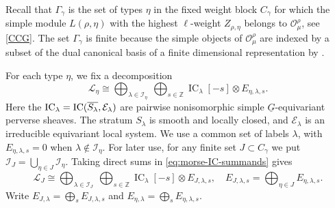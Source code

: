 \documentclass[11pt,reqno]{amsart}
\theoremstyle{definition}
\theoremstyle{remark}
\def\bbZ{\mathbb Z}
\def\dG{\underline G}
\def\scrO{\mathscr O}
\def\IC{\operatorname{IC}}
\begin{document}
Recall that $\Gamma_\gamma$ is the set of types $\eta$ in the fixed weight block $C_\gamma$
for which the simple module $L(\rho,\eta)$ with the highest $\ell$-weight
$Z_{\rho,\eta}$ belongs to $\scrO_\mu^\rho$, see \eqref{CCG}. 
The set $\Gamma_\gamma$ is finite because the simple objects of $\scrO_\mu^\rho$
 are indexed by a subset of
the dual canonical basis of a finite dimensional representation by
\cite[Prop.~4.4.1, Thm.~4.4.2]{VV25}.

For each type $\eta$, we fix a decomposition
\begin{equation}\label{eq:morse-IC-summands}
 \mathscr L_\eta\cong\bigoplus_{\lambda\in\mathcal I_\eta}\ \bigoplus_{s\in\bbZ}
 \IC_\lambda[-s]\otimes E_{\eta,\lambda,s}.
\end{equation}
Here the $\IC_\lambda={\rm IC}(\overline{S_\lambda},\mathcal E_\lambda)$ are
pairwise nonisomorphic simple $\dG$-equivariant perverse sheaves.
The stratum $S_\lambda$ is smooth and locally closed, and $\mathcal E_\lambda$
is an irreducible equivariant local system. We use a common set of labels
$\lambda$, with $E_{\eta,\lambda,s}=0$ when $\lambda\notin\mathcal I_\eta$.
For later use, for any finite set $J\subset C_\gamma$ we put
$\mathcal I_J=\bigcup_{\eta\in J}\mathcal I_\eta.$
Taking direct sums in \eqref{eq:morse-IC-summands} gives
\begin{equation}\label{eq:morse-IC-decomposition}
 \mathscr L_J\cong\bigoplus_{\lambda\in\mathcal I_J}\ \bigoplus_{s\in\bbZ}
 \IC_\lambda[-s]\otimes E_{J,\lambda,s},\quad
 E_{J,\lambda,s}=\bigoplus_{\eta\in J}E_{\eta,\lambda,s}.
\end{equation}
Write $E_{J,\lambda}=\bigoplus_s E_{J,\lambda,s}$ and
$E_{\eta,\lambda}=\bigoplus_sE_{\eta,\lambda,s}$.
\end{document}

